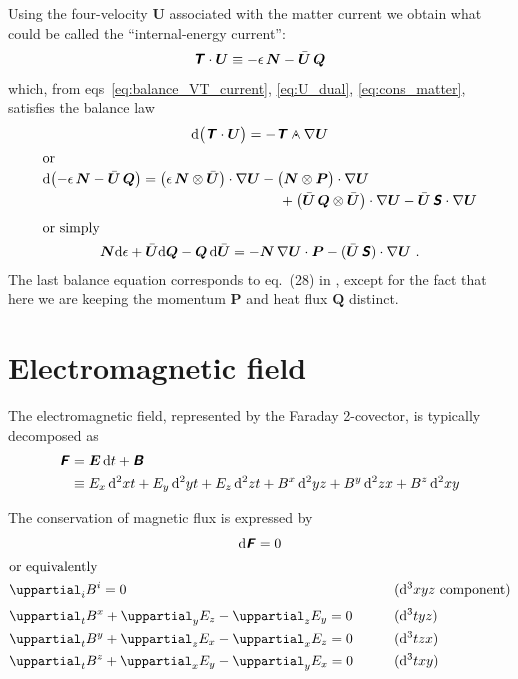 \documentclass[\ifafour a4paper,12pt,\else a5paper,10pt,\fi%
onecolumn,oneside,article,%
british%
]{memoir}
\theoremstyle{remark}
\theoremstyle{innote}
\newcommand*{\mathte}[1]{\textbf{\textit{\textsf{#1}}}}
\newcommand*{\de}{\uppartial}%
\newcommand*{\di}{\mathrm{d}}%
\renewcommand*{\|}[1][]{\nonscript\:#1\vert\nonscript\:\mathopen{}}
\newcommand*{\chap}{ch.}%
\newcommand*{\eqn}{eq.}%
\newcommand*{\eqns}{eqs}%
\newcommand*{\dand}{\mathbin{\mathclap{\mkern12.5mu\bm{\cdot}}\wedge}}
\newcommand*{\si}[1]{\di{#1}}
\newcommand*{\ssi}[1]{\di^{2}{#1}}
\newcommand*{\sssi}[1]{\di^{3}{#1}}
\newcommand*{\yN}{\bm{N}}
\newcommand*{\yP}{\bm{P}}
\newcommand*{\yQ}{\bm{Q}}
\newcommand*{\yS}{\mathte{S}}
\newcommand*{\yT}{\mathte{T}}
\newcommand*{\yU}{\bm{U}}
\newcommand*{\yUd}{\bar{\bm{U}}}
\newcommand*{\yF}{\mathte{F}}
\newcommand*{\yE}{\bm{E}}
\newcommand*{\yB}{\mathte{B}}
\begin{document}
Using the four-velocity $\yU$ associated with the matter current we obtain what could be called the \enquote{internal-energy current}:
\begin{equation}
  \label{eq:inten_current}
  \yT\cdot\yU \equiv -\epsilon\,\yN - \yUd\, \yQ
\end{equation}
which, from \eqns~\eqref{eq:balance_VT_current}, \eqref{eq:U_dual}, \eqref{eq:cons_matter}, satisfies the balance law
\begin{gather}
  \di\bigl(\yT\cdot\yU\bigr) = - \yT \dand \nabla\yU
  \\
  \shortintertext{or}
  \label{eq:balance_TU_matter}
  \begin{multlined}[0.9\linewidth]
    \di\bigl(-\epsilon\,\yN - \yUd\, \yQ\bigr) =
\bigl(\epsilon\,\yN \otimes \yUd\bigr) \cdot\nabla\yU
- \bigl(\yN \otimes \yP\bigr) \cdot\nabla\yU \\
{}
    +\bigl(\yUd \,\yQ\otimes\yUd\bigr) \cdot\nabla\yU
    -\yUd \,\yS \cdot\nabla\yU
  \end{multlined}
  \\[\jot]
  \shortintertext{or simply}
  \yN\di\epsilon + \yUd\di\yQ - \yQ\,\di\yUd =
  -\yN\,\nabla\yU \cdot \yP
  -(\yUd\,\yS)\cdot\nabla\yU \ .
\end{gather}
The last balance equation corresponds to \eqn~(28) in \textcites{eckart1940c}, except for the fact that here we are keeping the momentum $\yP$ and heat flux $\yQ$ distinct.


\section{Electromagnetic field}
\label{sec:EM_field}

The electromagnetic field, represented by the Faraday 2-covector, is typically decomposed as \autocites[\chap~9]{frankel1979}
\begin{equation}
  \label{eq:F_decomp_EB}
  \begin{split}
    \yF &= \yE\,\si{t} + \yB
    \\&\equiv
    E_{x}\, \ssi{xt}
    +  E_{y}\, \ssi{yt}
    + E_{z}\, \ssi{zt}
    + B^{x}\,\ssi{yz}
    + B^{y}\,\ssi{zx}
    + B^{z}\,\ssi{xy}
  \end{split}
\end{equation}

The conservation of magnetic flux is expressed by
\begin{gather}
  \label{eq:dFzero}
  \di\yF = 0
  \\
  \shortintertext{or equivalently}
  \begin{aligned}
    &\de_{i} B^{i} = 0
    &&\qquad\text{($\sssi{xyz}$ component)}
    \\[\jot]
    &\de_{t}B^{x} + \de_{y}E_{z} - \de_{z} E_{y} = 0
    &&\qquad\text{($\sssi{tyz}$)}
    \\
    &\de_{t}B^{y} + \de_{z}E_{x} - \de_{x} E_{z} = 0
    &&\qquad\text{($\sssi{tzx}$)}
    \\
    &\de_{t}B^{z} + \de_{x}E_{y} - \de_{y} E_{x} = 0
    &&\qquad\text{($\sssi{txy}$)}
  \end{aligned}
\end{gather}
\end{document}
